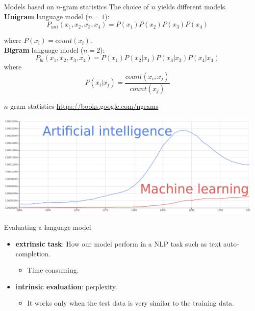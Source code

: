 \documentclass[10pt]{beamer}
\begin{document}
\begin{frame}{Models based on $n$-gram statistics}
The choice of $n$ yields different models.\\

\textbf{Unigram} language model ($n=1$): 
\begin{equation*}
P_{uni}(x_1, x_2, x_3, x_4) = P(x_1)P(x_2)P(x_3)P(x_4)
\end{equation*}

where $P(x_i) = count(x_i)$.\\

\textbf{Bigram} language model ($n=2$): 
\begin{equation*}
P_{bi}(x_1,x_2,x_3,x_4) = P(x_1)P(x_2\vert x_1)P(x_3\vert x_2)P(x_4\vert x_3)
\end{equation*} 
where
\[
P(x_i\vert x_j) = \frac{count(x_i, x_j)}{count(x_j)}
\]
\end{frame}

\begin{frame}{$n$-gram statistics}
\url{https://books.google.com/ngrams}
\vspace{0.4cm}

\includegraphics[scale=0.14]{images/AI_ML.png}
\end{frame}



\begin{frame}{Evaluating a language model}

\begin{itemize}
\item \textbf{extrinsic task}: How our model perform in a NLP task such as text auto-completion.
\begin{itemize}
\item Time consuming.
\end{itemize}
\vspace{0.5cm}
\item \textbf{intrinsic evaluation}: perplexity.
\begin{itemize}
\item It works only when the test data is very similar to the training data.
\end{itemize}
\end{itemize}
\end{frame}
\end{document}
